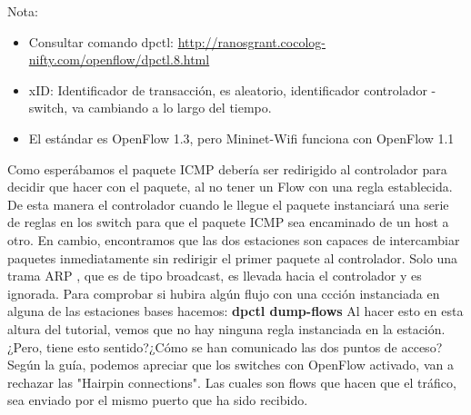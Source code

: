 \newline
Nota: 
\begin{itemize}
    \item Consultar comando dpctl: \url{http://ranosgrant.cocolog-nifty.com/openflow/dpctl.8.html}
    \item xID: Identificador de transacción, es aleatorio, identificador controlador - switch, va cambiando a lo largo del tiempo.  
    \item El estándar es OpenFlow 1.3, pero Mininet-Wifi funciona con OpenFlow 1.1
\end{itemize}

Como esperábamos el paquete ICMP debería ser redirigido al controlador para decidir que hacer con el paquete, al no tener un Flow con una regla establecida. De esta manera el controlador cuando  le llegue el paquete instanciará una serie de reglas en los switch para que el paquete ICMP sea encaminado de un host a otro. En cambio, encontramos que las dos estaciones son capaces de intercambiar paquetes inmediatamente sin redirigir el primer paquete al controlador. Solo una trama ARP , que es de tipo broadcast, es llevada hacia el controlador y es ignorada.\newline
\newline
Para comprobar si hubira algún flujo con una ccción instanciada en alguna de las estaciones bases hacemos:
\textbf{dpctl dump-flows}
\newline
\newline
Al hacer esto en esta altura del tutorial, vemos que no hay ninguna regla instanciada en la estación. ¿Pero, tiene esto sentido?¿Cómo se han comunicado las dos puntos de acceso?\newline
\newline
Según la guía, podemos apreciar que los switches con OpenFlow activado, van a rechazar las "Hairpin connections". Las cuales son flows que hacen que el tráfico, sea enviado por el mismo puerto que ha sido recibido.

